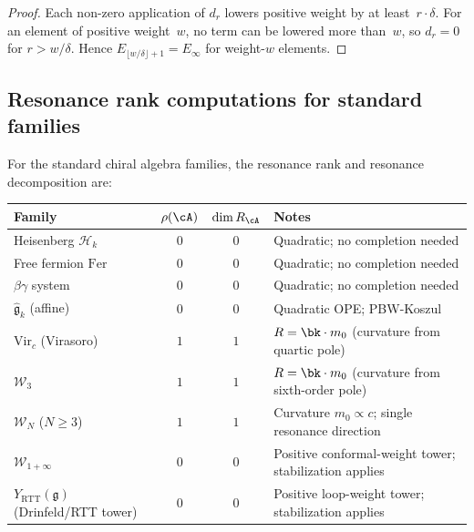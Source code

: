 \begin{proof}
Each non-zero application of $d_r$ lowers positive weight by at
least~$r \cdot \delta$. For an element of positive weight~$w$,
no term can be lowered more than~$w$, so $d_r = 0$ for
$r > w/\delta$. Hence $E_{\lfloor w/\delta \rfloor + 1}
= E_\infty$ for weight-$w$ elements.
\end{proof}

\subsection{Resonance rank computations for standard families}

\begin{proposition}
\label{prop:resonance-ranks-standard}
For the standard chiral algebra families, the resonance rank
and resonance decomposition are:
\begin{center}
\renewcommand{\arraystretch}{1.3}
\begin{tabular}{lccl}
\textbf{Family} & $\rho(\cA)$ & $\dim R_\cA$ & \textbf{Notes} \\
\hline
Heisenberg $\mathcal{H}_k$ & $0$ & $0$
 & Quadratic; no completion needed \\
Free fermion $\mathrm{Fer}$ & $0$ & $0$
 & Quadratic; no completion needed \\
$\beta\gamma$ system & $0$ & $0$
 & Quadratic; no completion needed \\
$\widehat{\mathfrak{g}}_k$ \textup{(}affine\textup{)} & $0$ & $0$
 & Quadratic OPE; PBW-Koszul \\
$\mathrm{Vir}_c$ \textup{(}Virasoro\textup{)} & $1$ & $1$
 & $R = \bk \cdot m_0$
 \textup{(}curvature from quartic pole\textup{)} \\
$\mathcal{W}_3$ & $1$ & $1$
 & $R = \bk \cdot m_0$
 \textup{(}curvature from sixth-order pole\textup{)} \\
$\mathcal{W}_N$ \textup{(}$N \ge 3$\textup{)} & $1$ & $1$
 & Curvature $m_0 \propto c$;
 single resonance direction \\
$\mathcal{W}_{1+\infty}$ & $0$ & $0$
 & Positive conformal-weight tower;
 stabilization applies \\
$Y_{\mathrm{RTT}}(\mathfrak{g})$ \textup{(}Drinfeld/RTT tower\textup{)} & $0$ & $0$
 & Positive loop-weight tower;
 stabilization applies
\end{tabular}
\end{center}
\end{proposition}

